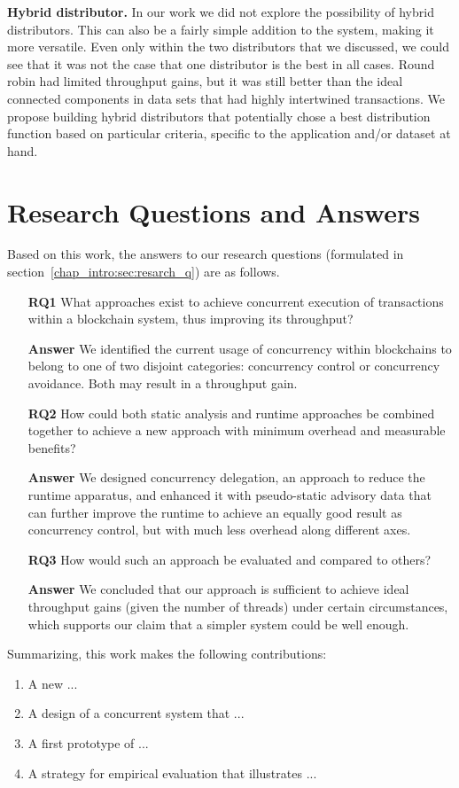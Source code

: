\textbf{Hybrid distributor.} In our work we did not explore the possibility of hybrid distributors.
This can also be a fairly simple addition to the system, making it more versatile. Even only within
the two distributors that we discussed, we could see that it was not the case that one distributor
is the best in all cases. Round robin had limited throughput gains, but it was still better than the
ideal connected components in data sets that had highly intertwined transactions. We propose
building hybrid distributors that potentially chose a best distribution function based on particular criteria, 
specific to the application and/or dataset at hand.

\section{Research Questions and Answers}
Based on this work, the answers to our research questions (formulated in section~\ref{chap_intro:sec:resarch_q}) are as follows. 

\begin{enumerate}
	\item [\textbf{RQ1}] What approaches exist to achieve concurrent execution of transactions within a
	blockchain system, thus improving its throughput?

	\item [\textbf{Answer}] We identified the current usage of concurrency within blockchains to belong to one of two disjoint
	categories: concurrency control or concurrency avoidance. Both
	may result in a throughput gain.

	\item [\textbf{RQ2}] How could both static analysis and runtime approaches be combined together to
	achieve a new approach with minimum overhead and measurable benefits?

	\item [\textbf{Answer}] We designed concurrency delegation, an approach to reduce the runtime apparatus, 
	and enhanced it with pseudo-static advisory data that can further improve the
	runtime to achieve an equally good result as concurrency control, but with much less overhead along
	different axes.
	
	\item [\textbf{RQ3}] How would such an approach be evaluated and compared to others?

	\item [\textbf{Answer}] We concluded that our approach is sufficient to achieve ideal throughput
	gains (given the number of threads) under certain circumstances, which supports our claim that a
	simpler system could be well enough.
\end{enumerate}

Summarizing, this work makes the following contributions: 
\begin{enumerate}
    \item A new ... 
    \item A design of a concurrent system that ... 
    \item A first prototype of ... 
    \item A strategy for empirical evaluation that illustrates ... 
\end{enumerate}